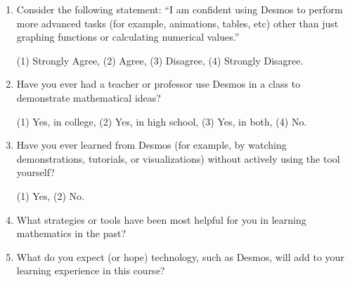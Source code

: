 \documentclass[11pt]{article}
\begin{document}
\begin{enumerate}[{$\qquad 1.]
\item Consider the following statement: ``I am confident using Desmos to perform more advanced tasks (for example, animations, tables, etc) other than just graphing functions or calculating numerical values.''
\begin{center} 
(1) Strongly Agree, \qquad (2) Agree, \qquad (3) Disagree, \qquad (4) Strongly Disagree. \end{center}

\item Have you ever had a teacher or professor use Desmos in a class to demonstrate mathematical ideas? 
\begin{center} 
(1) Yes, in college, \qquad (2) Yes, in high school, \qquad (3) Yes, in both, \qquad (4) No. \end{center}

\item Have you ever learned from Desmos (for example, by watching demonstrations, tutorials, or visualizations) without actively using the tool yourself? 
\begin{center} 
(1) Yes, \qquad (2) No. \end{center}


\item What strategies or tools have been most helpful for you in learning mathematics in the past? \vfill

\item What do you expect (or hope) technology, such as Desmos, will add to your learning experience in this course? \vfill


\end{enumerate}
\end{document}

